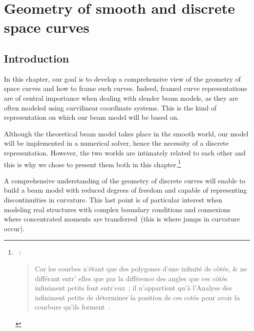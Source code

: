 
\chapter{Geometry of smooth and discrete space curves}\label{chp=curve}
\section{Introduction}
In this chapter, our goal is to develop a comprehensive view of the geometry of space curves and how to frame such curves. Indeed, framed curve representations are of central importance when dealing with slender beam models, as they are often modeled using curvilinear coordinate systems. This is the kind of representation on which our beam model will be based on.

Although the theoretical beam model takes place in the smooth world, our model will be implemented in a numerical solver, hence the necessity of a discrete representation. However, the two worlds are intimately related to each other and this is why we chose to present them both in this chapter.\footnote{~: \blockquote{Car les courbes n’étant que des polygones d’une infinité de côtés, \& ne différant
entr' elles que par la différence des angles que ces côtés infiniment petits font
entr'eux~; il n’appartient qu’à l’Analyse des infiniment petits de déterminer la
position de ces cotés pour avoir la courbure qu’ils forment~\belp{}.}}

A comprehensive understanding of the geometry of discrete curves will enable to build a beam model with reduced degrees of freedom and capable of representing discontinuities in curvature. This last point is of particular interest when modeling real structures with complex boundary conditions and connexions where concentrated moments are transferred~(this is where jumps in curvature occur).

